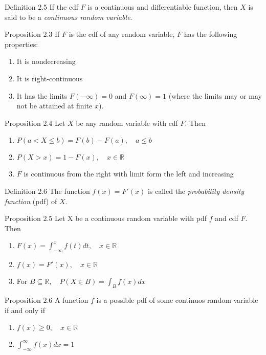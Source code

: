 \begin{boks}{Definition 2.5}
If the cdf $F$ is a continuous and differentiable function, then $X$ is said to be a \textit{continuous random variable}.
\end{boks}

\begin{boks}{Proposition 2.3}
If $F$ is the cdf of any random variable, $F$ has the following properties:
\begin{enumerate}
    \item It is nondecreasing
    \item It is right-continuous
    \item It has the limits $F(-\infty) = 0$ and $F(\infty) = 1$ (where the limits may or may not be attained at finite $x$).
\end{enumerate}
\end{boks}

\begin{boks}{Proposition 2.4}
Let $X$ be any random variable with cdf $F$. Then
\begin{enumerate}
    \item $P(a < X \leq b) = F(b) - F(a), \quad a \leq b$
    \item $P(X > x) = 1 - F(x), \quad x \in \mathbb{R}$
    \item $F$ is continuous from the right with limit form the left and increasing
\end{enumerate}
\end{boks}

\begin{boks}{Definition 2.6}
The function $f(x) = F'(x)$ is called the \textit{probability density function} (pdf) of $X$.
\end{boks}

\begin{boks}{Proposition 2.5}
Let X be a continuous random variable with pdf $f$ and cdf $F$. Then
\begin{enumerate}
    \item $F(x) = \int_{-\infty}^x f(t)dt, \quad x \in \mathbb{R}$
    \item $f(x) = F'(x), \quad x \in \mathbb{R}$
    \item For $B \subseteq \mathbb{R}, \quad P(X\in B) = \int_B f(x)dx$
\end{enumerate}
\end{boks}

\begin{boks}{Proposition 2.6}
A function $f$ is a possible pdf of some continuos random variable if and only if
\begin{enumerate}
    \item $f(x) \geq 0, \quad x \in \mathbb{R}$
    \item $\int_{-\infty}^\infty f(x)dx = 1$
\end{enumerate}
\end{boks}

